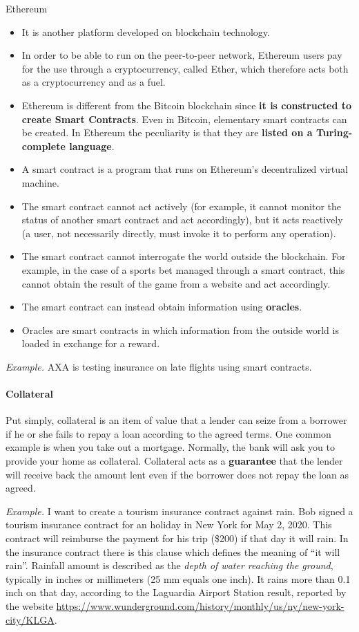 Ethereum
\begin{itemize}
    \item It is another platform developed on blockchain technology.
    \item In order to be able to run on the peer-to-peer network, Ethereum users pay for the use through a cryptocurrency, called Ether, which therefore acts both as a cryptocurrency and as a fuel.
    \item Ethereum is different from the Bitcoin blockchain since \textbf{it is constructed to create Smart Contracts}. Even in Bitcoin, elementary smart contracts can be created. In Ethereum the peculiarity is that they are \textbf{listed on a Turing-complete language}.
    \item A smart contract is a program that runs on Ethereum's decentralized virtual machine.
    \item The smart contract cannot act actively (for example, it cannot monitor the status of another smart contract and act accordingly), but it acts reactively (a user, not necessarily directly, must invoke it to perform any operation).
    \item The smart contract cannot interrogate the world outside the blockchain. For example, in the case of a sports bet managed through a smart contract, this cannot obtain the result of the game from a website and act accordingly.
    \item The smart contract can instead obtain information using \textbf{oracles}.
    \item Oracles are smart contracts in which information from the outside world is loaded in exchange for a reward.
\end{itemize}

\emph{Example.} AXA is testing insurance on late flights using smart contracts.

\paragraph{Collateral} Put simply, collateral is an item of value that a lender can seize from a borrower if he or she fails to repay a loan according to the agreed terms. One common example is when you take out a mortgage. Normally, the bank will ask you to provide your home as collateral.
Collateral acts as a \textbf{guarantee} that the lender will receive back the amount lent even if the borrower does not repay the loan as agreed.

\emph{Example.} I want to create a tourism insurance contract against rain. Bob signed a tourism insurance contract for an holiday in New York for May 2, 2020. This contract will reimburse the payment for his trip (\$200) if that day it will rain. In the insurance contract there is this clause which defines the meaning of ``it will rain''. Rainfall amount is described as the \emph{depth of water reaching the ground}, typically in inches or millimeters (25 mm equals one inch). It rains more than 0.1 inch on that day, according to the Laguardia Airport Station result, reported by the website \url{https://www.wunderground.com/history/monthly/us/ny/new-york-city/KLGA}.

